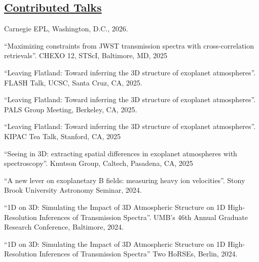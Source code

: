 \documentclass[letterpaper,12pt]{article}
\newcommand{\shortershorterSection}[1]{\subsection{#1}}
\renewcommand{\small}{\normalsize}
\renewcommand{\scriptsize}{\normalsize}
\begin{document}
\shortershorterSection{\underline{Contributed Talks}}

\small
  \begin{list}{}{\cvlist}
    \item[{\color{numcolor}\scriptsize19}] Carnegie EPL, Washington, D.C., 2026.

    \item[{\color{numcolor}\scriptsize18}] ``Maximizing constraints from JWST transmission spectra with cross-correlation retrievals''. CHEXO 12, STScI, Baltimore, MD, 2025
    
   \item[{\color{numcolor}\scriptsize17}] ``Leaving Flatland: Toward inferring the 3D structure of exoplanet atmospheres''. FLASH Talk, UCSC, Santa Cruz, CA, 2025.

   \item[{\color{numcolor}\scriptsize16}] ``Leaving Flatland: Toward inferring the 3D structure of exoplanet atmospheres''. PALS Group Meeting, Berkeley, CA, 2025. 


   \item[{\color{numcolor}\scriptsize15}] ``Leaving Flatland: Toward inferring the 3D structure of exoplanet atmospheres''. KIPAC Tea Talk, Stanford, CA, 2025 

      \item[{\color{numcolor}\scriptsize14}] ``Seeing in 3D: extracting spatial differences in exoplanet atmospheres
with spectroscopy''. Knutson Group, Caltech, Pasadena, CA, 2025

    \item[{\color{numcolor}\scriptsize13}]  ``A new lever on exoplanetary B fields: measuring heavy ion velocities''. Stony Brook University Astronomy Seminar, 2024. 

  \item[{\color{numcolor}\scriptsize12}]  ``1D on 3D: Simulating the Impact of 3D Atmospheric Structure on 1D High-Resolution Inferences of Transmission Spectra''. UMB's 46th Annual Graduate Research Conference, Baltimore, 2024. 
  

    \item[{\color{numcolor}\scriptsize11}]  ``1D on 3D: Simulating the Impact of 3D Atmospheric Structure on 1D High-Resolution Inferences of Transmission Spectra'' Two HoRSEs, Berlin, 2024.


\end{list}
\end{document}
